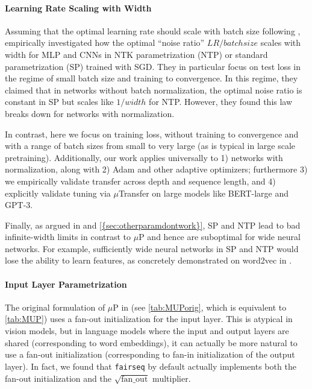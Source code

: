 \documentclass{article}
\theoremstyle{definition}
\newcommand{\fanout}{\mathrm{fan\_out}}
\begin{document}
\paragraph{Learning Rate Scaling with Width}

Assuming that the optimal learning rate should scale with batch size following \citep{smith_dont_2017}, \citep{park_effect_2019}
empirically investigated how the optimal ``noise ratio'' $LR/batchsize$ scales with width for MLP and CNNs in NTK parametrization (NTP) or standard parametrization (SP) trained with SGD.
They in particular focus on test loss in the regime of small batch size and training to convergence.
In this regime, they claimed that in networks without batch normalization, the optimal noise ratio is constant in SP but scales like $1/width$ for NTP.
However, they found this law breaks down for networks with normalization.

In contrast, here we focus on training loss, without training to convergence and with a range of batch sizes from small to very large (as is typical in large scale pretraining).
Additionally, our work applies universally to 1) networks with normalization, along with 2) Adam and other adaptive optimizers; furthermore 3) we empirically validate transfer across depth and sequence length, and 4) explicitly validate tuning via $\mu$Transfer on large models like BERT-large and GPT-3.

Finally, as argued in \citep{TP4} and \cref{{sec:otherparamdontwork}}, SP and NTP lead to bad infinite-width limits in contrast to $\mu$P and hence are suboptimal for wide neural networks.
For example, sufficiently wide neural networks in SP and NTP would lose the ability to learn features, as concretely demonstrated on word2vec in \citep{TP4}.

\paragraph{Input Layer Parametrization}
The original formulation of $\mu$P in \citep{TP4} (see \cref{tab:MUPorig}, which is equivalent to \cref{tab:MUP}) uses a fan-out initialization for the input layer.
This is atypical in vision models, but in language models where the input and output layers are shared (corresponding to word embeddings), it can actually be more natural to use a fan-out initialization (corresponding to fan-in initialization of the output layer).
In fact, we found that \texttt{fairseq} \citep{ott2019fairseq} by default actually implements both the fan-out initialization and the $\sqrt{\fanout}$ multiplier.
\end{document}
